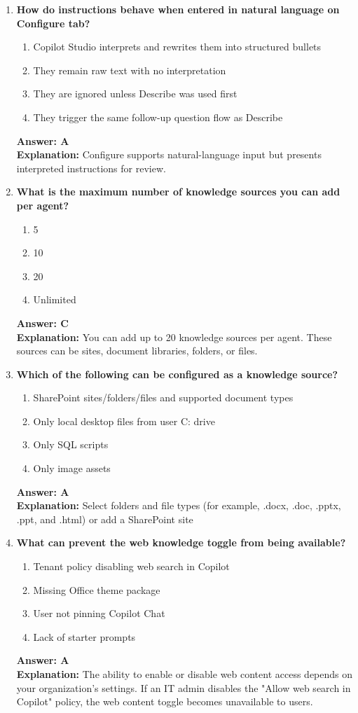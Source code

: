 \documentclass[10pt]{article}
\begin{document}
\begin{enumerate}[leftmargin=*]
\item \textbf{How do instructions behave when entered in natural language on Configure tab?}
\begin{enumerate}[label=\Alph*.]
  \item Copilot Studio interprets and rewrites them into structured bullets
  \item They remain raw text with no interpretation
  \item They are ignored unless Describe was used first
  \item They trigger the same follow-up question flow as Describe
\end{enumerate}
\textbf{Answer: A}\\
\textbf{Explanation:} Configure supports natural-language input but presents interpreted instructions for review.

\item \textbf{What is the maximum number of knowledge sources you can add per agent?}
\begin{enumerate}[label=\Alph*.]
  \item 5
  \item 10
  \item 20
  \item Unlimited
\end{enumerate}
\textbf{Answer: C}\\
\textbf{Explanation:} You can add up to 20 knowledge sources per agent. These sources can be sites, document libraries, folders, or files.

\item \textbf{Which of the following can be configured as a knowledge source?}
\begin{enumerate}[label=\Alph*.]
  \item SharePoint sites/folders/files and supported document types
  \item Only local desktop files from user C: drive
  \item Only SQL scripts
  \item Only image assets
\end{enumerate}
\textbf{Answer: A}\\
\textbf{Explanation:} Select folders and file types (for example, .docx, .doc, .pptx, .ppt, and .html) or add a SharePoint site

\item \textbf{What can prevent the web knowledge toggle from being available?}
\begin{enumerate}[label=\Alph*.]
  \item Tenant policy disabling web search in Copilot
  \item Missing Office theme package
  \item User not pinning Copilot Chat
  \item Lack of starter prompts
\end{enumerate}
\textbf{Answer: A}\\
\textbf{Explanation:} The ability to enable or disable web content access depends on your organization's settings. If an IT admin disables the "Allow web search in Copilot" policy, the web content toggle becomes unavailable to users.


\end{enumerate}
\end{document}
